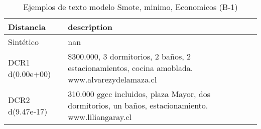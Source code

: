 \begin{table}[H]
\centering
\fontsize{10}{14}\selectfont
\caption{Ejemplos de texto modelo Smote, minimo, Economicos (B-1)}
\label{table-example-economicos-b-1-smote-enc-min-text}
\begin{tabular}{|l|m{35em}|}
\hline
\rowcolor[gray]{0.8}
Distancia & description \\
\hline Sintético & nan \\
\hline DCR1 d(0.00e+00) & \$300.000, 3 dormitorios, 2 ba\~nos, 2 estacionamientos, cocina amoblada. www.alvarezydelamaza.cl \\
\hline DCR2 d(9.47e-17) & 310.000 ggcc incluidos, plaza Mayor, dos dormitorios, un ba\~nos, estacionamiento. www.liliangaray.cl \\
\hline
\end{tabular}
\end{table}
